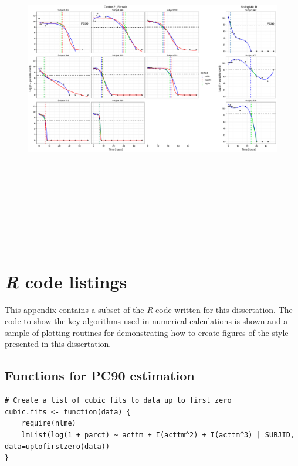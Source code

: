 \begin{singlespace}
\begin{figure}
\end{figure}
\begin{figure}
\centering
\includegraphics[height=150mm]{Afits2F.eps}
\end{figure}

\chapter{\emph{R} code listings}
\lstset{numberstyle=\small,
frame=single,
framesep=6pt,
tabsize=2,
basicstyle=\small\ttfamily,
showstringspaces=false,
columns = fullflexible,
language=R,
breaklines=true,
showstringspaces=false,
lineskip=-1pt}

This appendix contains a subset of the \emph{R} code written for this dissertation. The code to show the key algorithms used in numerical calculations is shown and a sample of plotting routines for demonstrating how to create figures of the style presented in this dissertation.

\section{Functions for PC90 estimation}\label{R:PC90}
\begin{lstlisting}[caption=Functions to find PC90 by cubic regression,label=R:cubics]
# Create a list of cubic fits to data up to first zero
cubic.fits <- function(data) {
	require(nlme)
	lmList(log(1 + parct) ~ acttm + I(acttm^2) + I(acttm^3) | SUBJID, data=uptofirstzero(data))
}


\end{lstlisting}
\end{singlespace}

